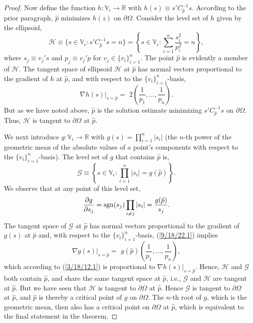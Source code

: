 \documentclass{amsart}
\numberwithin{equation}{section}
\theoremstyle{definition}
\numberwithin{theorem}{section}
\begin{document}
\begin{proof}
Now define the function  $h:\mathbb{V}_\epsilon\rightarrow \mathbb{R}$ with $h(s) \equiv s'C^{-1}_{\hat{p}} s$. According to the prior paragraph, $\hat{p}$ minimizes $h(z)$ on  $\partial\Omega$.   Consider the level set of $h$ given by the ellipsoid, \[ \mathcal{H} \equiv \{s\in \mathbb{V}_\epsilon: s'C_{\hat{p}}^{-1} s = n \} = \left\{s\in\mathbb{V}_\epsilon: \sum_{i=1}^n \frac{s_i^2}{p_i^2} = n\right\},\] where $s_j\equiv v_j's$ and  $p_j\equiv v_j'p$ for $v_j\in \{v_i\}_{i=1}^n$.  
The point $\hat{p}$ is evidently a member of $\mathcal{H}$.  The tangent space of ellipsoid $\mathcal{H}$ at $\hat{p}$  has normal vectors proportional to the gradient of $h$ at $\hat{p}$, and with respect to the $\{v_i\}_{i=1}^n$-basis,
\begin{equation}\label{3/18/12.1}  \nabla h(s)\Big|_{s=\hat{p}} = \,\, 2\left(\frac{1}{p_1},\dots, \frac{1}{p_n}\right).\end{equation} But as we have noted above, $\hat{p}$ is the solution estimate minimizing $s'C^{-1}_{\hat{p}} s$ on $\partial\Omega$.  Thus, $\mathcal{H}$ is tangent to $\partial\Omega$ at $\hat{p}$.  
 
We next introduce  $g:\mathbb{V}_\epsilon\rightarrow \mathbb{R}$ with $g(s) = \prod_{i=1}^n |s_i|$ (the $n$-th power of the geometric mean of the absolute values of a point's components with respect to the $\{v_i\}_{i=1}^n$-basis).  The level set of $g$ that contains $\hat{p}$ is,  \[\mathcal{G} \equiv \left\{ s\in \mathbb{V}_\epsilon:\prod_{i=1}^n |s_i| = g(\hat{p})\right\}.\] We observe that at any point of this level set,
   \begin{equation}\label{9/18/22.1} \frac{\partial g}{\partial s_j} = {\rm sgn}(s_j) \prod_{i\ne j} |s_i| = \frac{g(\hat{p})}{s_j}.\end{equation} The tangent space of $\mathcal{G}$ at $\hat{p}$ has normal vectors proportional to the gradient of $g(s)$ at $\hat{p}$ and, with respect to the $\{v_i\}_{i=1}^n$-basis, (\ref{9/18/22.1}) implies \begin{equation}\label{9/15/20.1} \nabla g(s)\Big|_{s=\hat{p}} = \,\, g(\hat{p}) \left(\frac{1}{p_1},\dots, \frac{1}{p_n}\right),\end{equation} which according to (\ref{3/18/12.1}) is proportional to $\nabla h(s)\big|_{s=\hat{p}}$.
Hence, $\mathcal{H}$ and $\mathcal{G}$ both contain $\hat{p}$, and share the same tangent space at $\hat{p}$, i.e., $\mathcal{G}$ and $\mathcal{H}$ are tangent at $\hat{p}$.  But we have seen that $\mathcal{H}$ is tangent to $\partial\Omega$ at $\hat{p}$.  Hence $\mathcal{G}$ is tangent to $\partial\Omega$ at $\hat{p}$, and $\hat{p}$ is thereby a critical point of $g$ on $\partial\Omega$.  The $n$-th root of $g$, which is the geometric mean, then also has a critical point on $\partial\Omega$ at $\hat{p}$, which is equivalent to the final statement in the theorem. 
 \end{proof} 
 
\end{document}
